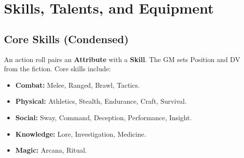 \section{Skills, Talents, and Equipment}

\subsection{Core Skills (Condensed)}
An action roll pairs an \textbf{Attribute} with a \textbf{Skill}. The GM sets Position and DV from the fiction. Core skills include:

\begin{itemize}[leftmargin=*]
  \item \textbf{Combat:} Melee, Ranged, Brawl, Tactics.
  \item \textbf{Physical:} Athletics, Stealth, Endurance, Craft, Survival.
  \item \textbf{Social:} Sway, Command, Deception, Performance, Insight.
  \item \textbf{Knowledge:} Lore, Investigation, Medicine.
  \item \textbf{Magic:} Arcana, Ritual.
\end{itemize}

